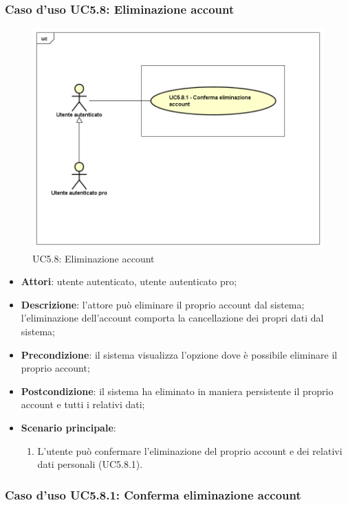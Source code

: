 \subsubsection{Caso d'uso UC5.8: Eliminazione account}
\label{UC5.8}
\begin{figure}[h]
	\centering
	\includegraphics[scale=0.5,keepaspectratio]{UML/UC5_8.png}
	\caption{UC5.8: Eliminazione account}
\end{figure}

\begin{itemize}
	\item \textbf{Attori}: utente autenticato, utente autenticato pro;
	\item \textbf{Descrizione}: l'attore può eliminare il proprio account dal sistema; l'eliminazione dell'account comporta la cancellazione dei propri dati dal sistema; 
	\item \textbf{Precondizione}: il sistema visualizza l'opzione dove è possibile eliminare il proprio account;
	\item \textbf{Postcondizione}: il sistema ha eliminato in maniera persistente il proprio account e tutti i relativi dati;
	\item \textbf{Scenario principale}:
		\begin{enumerate}
			\item L'utente può confermare l'eliminazione del proprio account e dei relativi dati personali (UC5.8.1).
		\end{enumerate}
\end{itemize}

\subsubsection{Caso d'uso UC5.8.1: Conferma eliminazione account}

